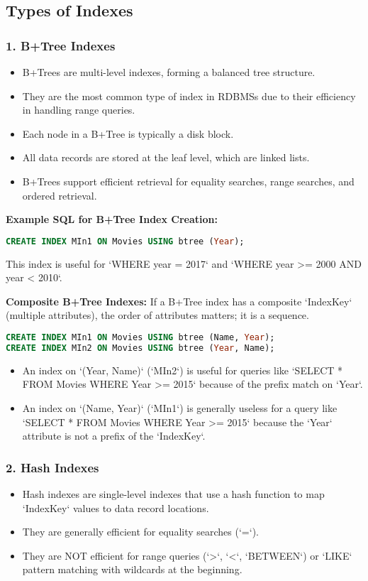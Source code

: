 \documentclass{article}
\begin{document}
\subsection*{Types of Indexes}
\subsubsection*{1. B+Tree Indexes}
\begin{itemize}
    \item B+Trees are multi-level indexes, forming a balanced tree structure.
    \item They are the most common type of index in RDBMSs due to their efficiency in handling range queries.
    \item Each node in a B+Tree is typically a disk block.
    \item All data records are stored at the leaf level, which are linked lists.
    \item B+Trees support efficient retrieval for equality searches, range searches, and ordered retrieval.
\end{itemize}

\textbf{Example SQL for B+Tree Index Creation:}
\begin{lstlisting}[language=SQL]
CREATE INDEX MIn1 ON Movies USING btree (Year);
\end{lstlisting}
This index is useful for `WHERE year = 2017` and `WHERE year >= 2000 AND year < 2010`.

\textbf{Composite B+Tree Indexes:}
If a B+Tree index has a composite `IndexKey` (multiple attributes), the order of attributes matters; it is a sequence.
\begin{lstlisting}[language=SQL]
CREATE INDEX MIn1 ON Movies USING btree (Name, Year);
CREATE INDEX MIn2 ON Movies USING btree (Year, Name);
\end{lstlisting}
\begin{itemize}
    \item An index on `(Year, Name)` (`MIn2`) is useful for queries like `SELECT * FROM Movies WHERE Year >= 2015` because of the prefix match on `Year`.
    \item An index on `(Name, Year)` (`MIn1`) is generally useless for a query like `SELECT * FROM Movies WHERE Year >= 2015` because the `Year` attribute is not a prefix of the `IndexKey`.
\end{itemize}

\subsubsection*{2. Hash Indexes}
\begin{itemize}
    \item Hash indexes are single-level indexes that use a hash function to map `IndexKey` values to data record locations.
    \item They are generally efficient for equality searches (`=`).
    \item They are NOT efficient for range queries (`>`, `<`, `BETWEEN`) or `LIKE` pattern matching with wildcards at the beginning.
\end{itemize}
\end{document}
